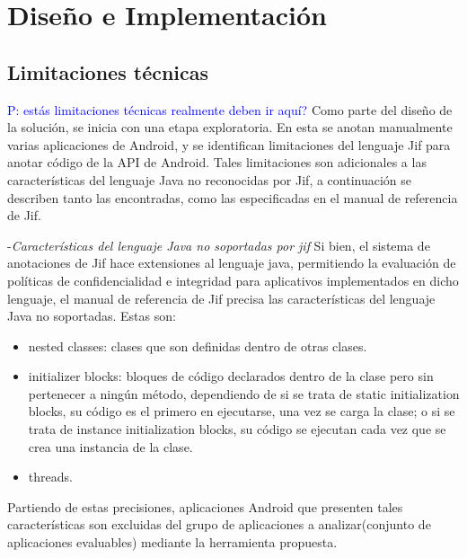 \label{ch:desing}
\chapter{Diseño e Implementación}


\section{Limitaciones técnicas}
\label{sec:limitaciones}
\textcolor{blue}{P: estás limitaciones técnicas realmente deben ir aquí?}
Como parte del diseño de la solución, se inicia con una etapa exploratoria. En
esta se anotan manualmente varias aplicaciones de Android, y se identifican
limitaciones del lenguaje Jif para anotar código de la API de Android.
Tales limitaciones son adicionales a las características del lenguaje Java no
reconocidas por Jif, a continuación se describen tanto las encontradas, como las
especificadas en el manual de referencia de Jif.

-\textit{Características del lenguaje Java no soportadas por jif}\newline
Si bien, el sistema de anotaciones de Jif hace extensiones al lenguaje java,
permitiendo la evaluación de políticas de confidencialidad e integridad para
aplicativos implementados en dicho lenguaje, el manual de referencia de Jif
precisa las características del lenguaje Java no soportadas\cite{jifRef}. Estas
son:
\begin{itemize}
  \item nested classes: clases que son definidas dentro de otras clases.
  \item initializer blocks: bloques de código declarados dentro de la clase pero
  sin pertenecer a ningún método, dependiendo de si se trata de static
  initialization blocks, su código es el primero en ejecutarse, una vez se
  carga la clase; o si se trata de instance initialization blocks, su código se
  ejecutan cada vez que se crea una instancia de la clase.
\item threads.
\end{itemize} 
Partiendo de estas precisiones, aplicaciones Android que presenten tales
características son excluidas del grupo de aplicaciones a analizar(conjunto de
aplicaciones evaluables) mediante la herramienta propuesta.


